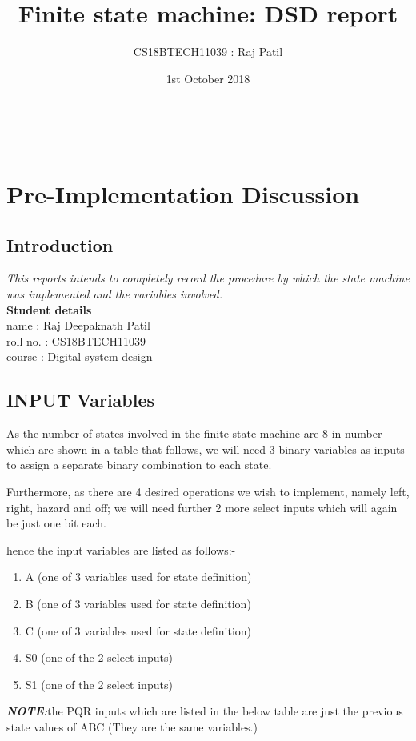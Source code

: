 \documentclass[12pt,a4paper]{report}
\title{Finite state machine: DSD report}
\author{CS18BTECH11039 : Raj Patil}
\date{1st  October  2018}
\begin{document}
\maketitle

\tableofcontents

\\

\chapter{Pre-Implementation Discussion}

\section{Introduction}
\textit{This reports intends to completely record the procedure by which the state machine was implemented and the variables involved.
\\}
\textbf
{Student details\\}
name : Raj Deepaknath Patil \\
roll no. : CS18BTECH11039 \\
course : Digital system design \\

\section{INPUT Variables}

As the number of states involved in the finite state machine are 8 in number
which are shown in a table that follows, we will need 3 binary variables as inputs to assign a separate binary combination to each state.

Furthermore, as there are 4 desired operations we wish to implement, namely left, right, hazard and off; we will need further 2 more select inputs which will again be just one bit each.

hence the input variables are listed as follows:-
\begin{enumerate}
    \item A (one of 3 variables used for state definition)
    \item B (one of 3 variables used for state definition)
    \item C (one of 3 variables used for state definition)
    \item S0 (one of the 2 select inputs)
    \item S1 (one of the 2 select inputs)
\end{enumerate}
\textit{\textbf{NOTE:}}the PQR inputs which are listed in the below table are just the previous state values of ABC (They are the same variables.) 
\clearpage
\end{document}
